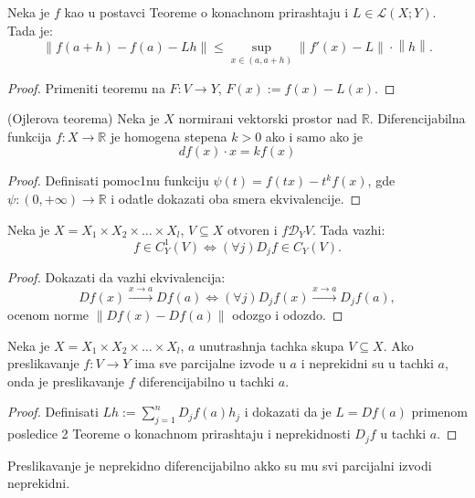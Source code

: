 \documentclass[a4paper,12pt]{article}
\newcommand{\R}{\mathbb{R}}
\newcommand{\RR}{\mathbb{R}}
\newcommand{\psj}{\subseteq}
\newcommand{\ds}{\displaystyle}
\newcommand{\norm}[1]{\left\lVert#1\right\rVert}
\begin{document}
\begin{posl}
	Neka je $f$ kao u postavci Teoreme o konachnom prirashtaju i $L \in \mathcal{L}(X; Y)$. Tada je:
	\[ \norm{f(a+h) - f(a) - Lh} \leq \sup_{x\in(a, a+h)} \norm{f'(x) - L} \cdot \norm h .\] 
\end{posl}
\begin{proof}
	Primeniti teoremu na $F:V \to Y$, \( F(x) := f(x) - L(x)\). 
\end{proof}

\begin{tma}
(Ojlerova teorema) Neka je $X$ normirani vektorski prostor nad $\R$. Di\-fe\-ren\-ci\-ja\-bil\-na funkcija $f: X \to \R$ je homogena stepena $k>0$ ako i samo ako je \[df(x) \cdot x = k f(x)\]
\end{tma}
\begin{proof}
	Definisati pomoc1nu funkciju $\psi (t) = f(tx) - t^kf(x)$, gde $\psi:(0, +\infty) \to \RR$ i odatle dokazati oba smera ekvivalencije. 
\end{proof}


\begin{tvr}
	Neka je $X = X_1\times X_2\times \dotso \times X_l$, $V\psj X$ otvoren i $f\mathcal D_Y V$. Tada vazhi:
	\[ f \in C^1_Y(V) \iff (\forall j) D_j f \in C_Y(V) .\] 
\end{tvr}
\begin{proof}
	Dokazati da vazhi ekvivalencija:
	\[ Df(x) \overset{x\to a}{\longrightarrow} Df(a) \iff (\forall j)D_jf(x) \overset{x\to a}{\longrightarrow} D_jf(a) ,\] 
	ocenom norme $\norm{Df(x) - Df(a)}$ odozgo i odozdo.
\end{proof}

\begin{tma}
		Neka je $X = X_1\times X_2\times \dotso \times X_l$,  $a$ unutrashnja tachka skupa $V\psj X$. Ako preslikavanje $f:V\to Y$
		ima sve parcijalne izvode u $a$ i neprekidni su u tachki $a$, onda je preslikavanje $f$ diferencijabilno u tachki $a$.
\end{tma}
\begin{proof}
	Definisati $\ds{Lh := \sum_{j=1}^n D_jf(a)h_j}$ i dokazati da je $L = Df(a)$ primenom posledice 2 Teoreme o konachnom prirashtaju i 
	neprekidnosti $D_jf$ u tachki $a$.
\end{proof}

\begin{posl}
	Preslikavanje je neprekidno diferencijabilno akko su mu svi parcijalni izvodi neprekidni.
\end{posl}\\
\end{document}
